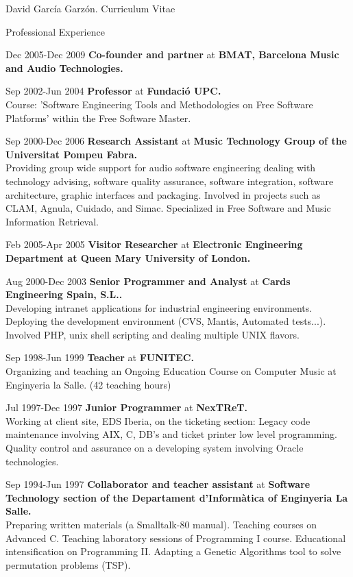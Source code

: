\documentclass{article}
\begin{document}
\begin{cv}{David García Garzón. Curriculum Vitae}
\begin{cvlist}{Professional Experience}
\item[Dec 2005-Dec 2009]
{\bf Co-founder and partner} at
{\bf BMAT, Barcelona Music and Audio Technologies.}\\


\item[Sep 2002-Jun 2004]
{\bf Professor} at
{\bf Fundació UPC.}\\
Course: 'Software Engineering Tools and Methodologies on Free Software Platforms' within the Free Software Master.

\item[Sep 2000-Dec 2006]
{\bf Research Assistant} at
{\bf Music Technology Group of the Universitat Pompeu Fabra.}\\
Providing group wide support for audio software engineering dealing with technology advising, software quality assurance, software integration, software architecture, graphic interfaces and packaging. Involved in projects such as CLAM, Agnula, Cuidado, and Simac. Specialized in Free Software and Music Information Retrieval.

\item[Feb 2005-Apr 2005]
{\bf Visitor Researcher} at
{\bf Electronic Engineering Department at Queen Mary University of London.}\\


\item[Aug 2000-Dec 2003]
{\bf Senior Programmer and Analyst} at
{\bf Cards Engineering Spain, S.L..}\\
Developing intranet applications for industrial engineering environments. Deploying the development environment (CVS, Mantis, Automated tests...). Involved PHP, unix shell scripting and dealing multiple UNIX flavors. 

\item[Sep 1998-Jun 1999]
{\bf Teacher} at
{\bf FUNITEC.}\\
Organizing and teaching an Ongoing Education Course on Computer Music at Enginyeria la Salle. (42 teaching hours)

\item[Jul 1997-Dec 1997]
{\bf Junior Programmer} at
{\bf NexTReT.}\\
Working at client site, EDS Iberia, on the ticketing section: Legacy code maintenance involving AIX, C, DB’s and ticket printer low level programming. Quality control and assurance on a developing system involving Oracle technologies.

\item[Sep 1994-Jun 1997]
{\bf Collaborator and teacher assistant} at
{\bf Software Technology section of the Departament d'Informàtica of Enginyeria La Salle.}\\
Preparing written materials (a Smalltalk-80 manual). Teaching courses on Advanced C. Teaching laboratory sessions of Programming I course. Educational intensification on Programming II. Adapting a Genetic Algorithms tool to solve permutation problems (TSP). 
	

\end{cvlist}
\end{cv}
\end{document}
